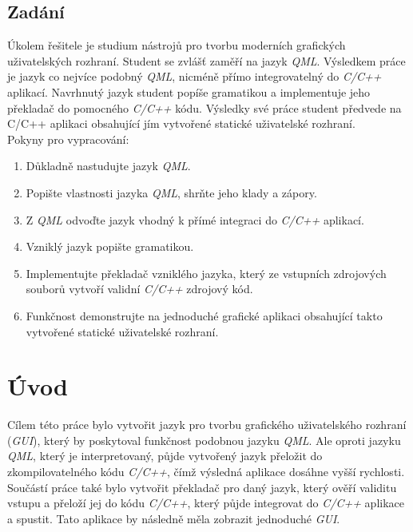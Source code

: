 \documentclass[11pt,twoside,a4paper]{book}
\begin{document}
\section{\label{SEC:Intro}Zadání}
Úkolem řešitele je studium nástrojů pro tvorbu moderních grafických uživatelských rozhraní.
Student se zvlášť zaměří na jazyk \textit{QML}. Výsledkem práce je jazyk co nejvíce podobný \textit{QML},
nicméně přímo integrovatelný do \textit{C/C++} aplikací. Navrhnutý jazyk student popíše gramatikou a
implementuje jeho překladač do pomocného \textit{C/C++} kódu. Výsledky své práce student předvede na
C/C++ aplikaci obsahující jím vytvořené statické uživatelské rozhraní.\\
Pokyny pro vypracování:
\begin{enumerate}
\item Důkladně nastudujte jazyk \textit{QML}.
\item Popište vlastnosti jazyka \textit{QML}, shrňte jeho klady a zápory.
\item Z \textit{QML} odvoďte jazyk vhodný k přímé integraci do \textit{C/C++} aplikací.
\item Vzniklý jazyk popište gramatikou.
\item Implementujte překladač vzniklého jazyka, který ze vstupních zdrojových souborů vytvoří
validní \textit{C/C++} zdrojový kód.
\item Funkčnost demonstrujte na jednoduché grafické aplikaci obsahující takto vytvořené statické
uživatelské rozhraní.
\end{enumerate}

\chapter{\label{CH:Intro}Úvod}
Cílem této práce bylo vytvořit jazyk pro tvorbu grafického uživatelského rozhraní (\textit{GUI}), který by poskytoval funkčnost podobnou jazyku \textit{QML}. Ale oproti jazyku \textit{QML}, který je interpretovaný, půjde vytvořený jazyk přeložit do zkompilovatelného kódu \textit{C/C++}, čímž výsledná aplikace dosáhne vyšší rychlosti. Součástí práce také bylo vytvořit překladač pro daný jazyk, který ověří validitu vstupu a přeloží jej do kódu \textit{C/C++}, který půjde integrovat do \textit{C/C++} aplikace a spustit. Tato aplikace by následně měla zobrazit jednoduché \textit{GUI}.
\end{document}
